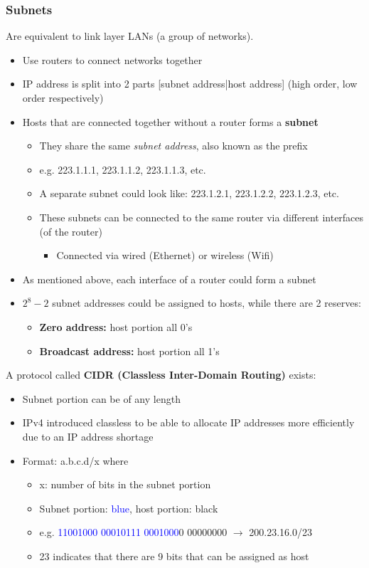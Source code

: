 \documentclass{article}
\begin{document}
\subsubsection{Subnets}
Are equivalent to link layer LANs (a group of networks).
\begin{itemize}
    \item Use routers to connect networks together
    \item IP address is split into 2 parts [subnet address|host address] (high order, low order respectively)
    \item Hosts that are connected together without a router forms a \textbf{subnet}
    \begin{itemize}
        \item They share the same \textit{subnet address}, also known as the prefix
        \item e.g. 223.1.1.1, 223.1.1.2, 223.1.1.3, etc.
        \item A separate subnet could look like: 223.1.2.1, 223.1.2.2, 223.1.2.3, etc.
        \item These subnets can be connected to the same router via different interfaces (of the router)
        \begin{itemize}
            \item Connected via wired (Ethernet) or wireless (Wifi)
        \end{itemize}
    \end{itemize}
    \item As mentioned above, each interface of a router could form a subnet
    \item $2^8-2$ subnet addresses could be assigned to hosts, while there are 2 reserves:
    \begin{itemize}
        \item \textbf{Zero address:} host portion all 0's
        \item \textbf{Broadcast address:} host portion all 1's
    \end{itemize}
\end{itemize}
A protocol called \textbf{CIDR (Classless Inter-Domain Routing)} exists:
\begin{itemize}
    \item Subnet portion can be of any length
    \item IPv4 introduced classless to be able to allocate IP addresses more efficiently due to an IP address
    shortage
    \item Format: a.b.c.d/x where
    \begin{itemize}
        \item x: number of bits in the subnet portion
        \item Subnet portion: \textcolor{blue}{blue}, host portion: black
        \item e.g. \textcolor{blue}{11001000 00010111 0001000}0 00000000 $\rightarrow$ 200.23.16.0/23
        \item 23 indicates that there are 9 bits that can be assigned as host
    \end{itemize}
\end{itemize}
\end{document}

